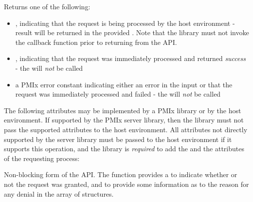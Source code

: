 Returns one of the following:

\begin{itemize}
    \item {}, indicating that the request is being processed by the host environment - result will be returned in the provided . Note that the library must not invoke the callback function prior to returning from the \ac{API}.
    \item {}, indicating that the request was immediately processed and returned \textit{success} - the  will \textit{not} be called
    \item a PMIx error constant indicating either an error in the input or that the request was immediately processed and failed - the  will \textit{not} be called
\end{itemize}

\optattrstart
The following attributes may be implemented by a \ac{PMIx} library or by the host environment. If supported by the \ac{PMIx} server library, then the library must not pass the supported attributes to the host environment. All attributes not directly supported by the server library must be passed to the host environment if it supports this operation, and the library is \textit{required} to add the  and the  attributes of the requesting process:


\optattrend

\descr


Non-blocking form of the  \ac{API}. The  function provides a  to indicate whether or not the request was granted, and to provide some information as to the reason for any denial in the  array of  structures.

